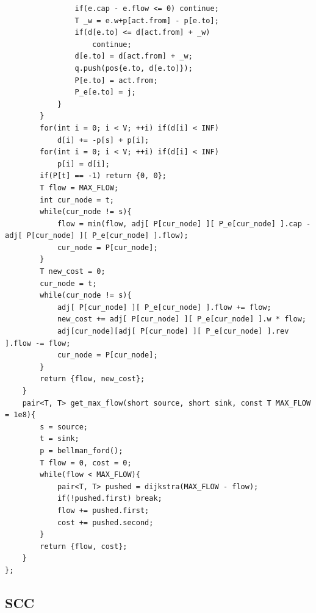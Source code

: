 \documentclass[12 pts,spanish,mexico]{article}
\numberwithin{equation}{section}
\begin{document}
\begin{multicols}{2}
\begin{verbatim}
                if(e.cap - e.flow <= 0) continue;
                T _w = e.w+p[act.from] - p[e.to];
                if(d[e.to] <= d[act.from] + _w)
                    continue;
                d[e.to] = d[act.from] + _w;
                q.push(pos{e.to, d[e.to]});
                P[e.to] = act.from;
                P_e[e.to] = j;
            }
        }
        for(int i = 0; i < V; ++i) if(d[i] < INF)
            d[i] += -p[s] + p[i];
        for(int i = 0; i < V; ++i) if(d[i] < INF)
            p[i] = d[i];
        if(P[t] == -1) return {0, 0};
        T flow = MAX_FLOW;
        int cur_node = t;
        while(cur_node != s){
            flow = min(flow, adj[ P[cur_node] ][ P_e[cur_node] ].cap - adj[ P[cur_node] ][ P_e[cur_node] ].flow);
            cur_node = P[cur_node];
        }
        T new_cost = 0;
        cur_node = t;
        while(cur_node != s){
            adj[ P[cur_node] ][ P_e[cur_node] ].flow += flow;
            new_cost += adj[ P[cur_node] ][ P_e[cur_node] ].w * flow;
            adj[cur_node][adj[ P[cur_node] ][ P_e[cur_node] ].rev ].flow -= flow;
            cur_node = P[cur_node];
        }
        return {flow, new_cost};
    }
    pair<T, T> get_max_flow(short source, short sink, const T MAX_FLOW = 1e8){
        s = source;
        t = sink;
        p = bellman_ford();
        T flow = 0, cost = 0;
        while(flow < MAX_FLOW){
            pair<T, T> pushed = dijkstra(MAX_FLOW - flow);
            if(!pushed.first) break;
            flow += pushed.first;
            cost += pushed.second;
        }
        return {flow, cost};
    }
};
\end{verbatim}

\subsection{SCC}

\end{multicols}
\end{document}
